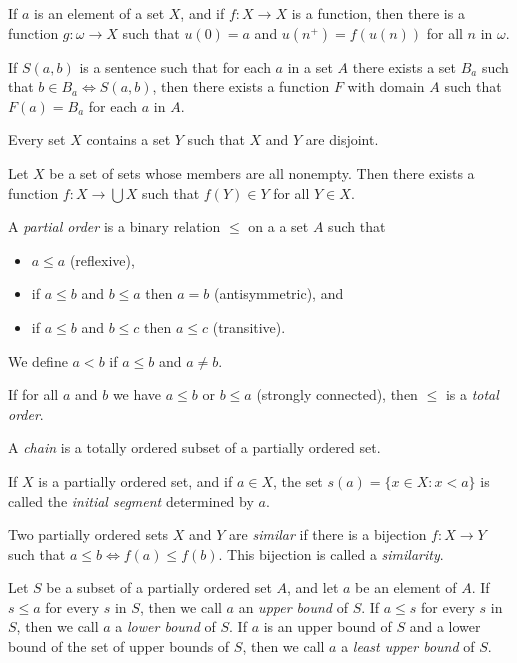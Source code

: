 \begin{thm}
  If $a$ is an element of a set $X$, and if $f:X\to X$ is a function, then there
  is a function $g:\omega\to X$ such that $u(0)=a$ and $u(n^+)=f(u(n))$ for all
  $n$ in $\omega$.
\end{thm}
\begin{axiom}[Substitution]
  If $S(a,b)$ is a sentence such that for each $a$ in a set $A$ there exists a
  set $B_a$ such that $b\in B_a\iff S(a,b)$, then there exists a function $F$ with
  domain $A$ such that $F(a)=B_a$ for each $a$ in $A$.
\end{axiom}
\begin{axiom}[Foundation]
  Every set $X$ contains a set $Y$ such that $X$ and $Y$ are disjoint.
\end{axiom}
\begin{axiom}[Choice]
  Let $X$ be a set of sets whose members are all nonempty. Then there exists a
  function $f:X\to\bigcup X$ such that $f(Y)\in Y$ for all $Y\in X$.
\end{axiom}
\begin{defn}
  A \emph{partial order} is a binary relation $\le$ on a a set $A$ such that
  \begin{itemize}
    \item $a\le a$ (reflexive),
    \item if $a\le b$ and $b\le a$ then $a=b$ (antisymmetric), and
    \item if $a\le b$ and $b\le c$ then $a\le c$ (transitive).
  \end{itemize}
  We define $a<b$ if $a\le b$ and $a\ne b$.

  If for all $a$ and $b$ we have $a\le b$ or $b\le a$ (strongly connected),
  then $\le$ is a \emph{total order}. 

  A \emph{chain} is a totally ordered subset of a partially ordered set.
\end{defn}
\begin{defn}
  If $X$ is a partially ordered set, and if $a\in X$, the set $s(a)=\{x\in
    X:x<a\}$ is called the \emph{initial segment} determined by $a$.
\end{defn}
\begin{defn}
  Two partially ordered sets $X$ and $Y$ are \emph{similar} if there is a
  bijection $f:X\to Y$ such that $a\le b\iff f(a)\le f(b)$. This bijection is
  called a \emph{similarity}.
\end{defn}
\begin{defn}
  Let $S$ be a subset of a partially ordered set $A$, and let $a$ be an element
  of $A$. If $s\le a$ for every $s$ in $S$, then we call $a$ an \emph{upper
    bound} of $S$. If $a\le s$ for every $s$ in $S$, then we call $a$ a
    \emph{lower bound} of $S$. If $a$ is an upper bound of $S$ and a lower
    bound of the set of upper bounds of $S$, then we call $a$ a \emph{least
      upper bound} of $S$.
\end{defn}
